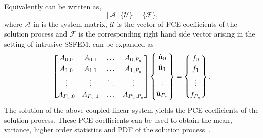 \documentclass[letter,1p,11pt,oneside,onecolumn,sort&compress]{elsarticle}
\begin{document}
Equivalently  can be written as,
\begin{equation}\label{eq:sFEM}
\mathcal{[A] \{U\} = \{F\}},
\end{equation}
where $\mathcal{A}$ in  is the system matrix,
$\mathcal{U}$ is the vector of PCE coefficients of the solution process and
$\mathcal{F}$ is the corresponding right hand side vector arising in the setting of intrusive SSFEM.  can be expanded as
\begin{align}
{\begin{bmatrix}
      A_{0,0} & A_{0,1} & \dots  &  A_{0,P_u}
\\[0.3em]
      A_{1,0} & A_{1,1} & \dots  &  A_{1,P_u}
\\[0.3em]
      \vdots  & \vdots  & \ddots &  \vdots
\\[0.3em]
     A_{P_u,0} & A_{P_u,1} & \dots  &  A_{P_u,P_u}
\end{bmatrix}}
\begin{Bmatrix}
    \mathrm{\hat{\bf{u}}}_0
\\[0.3em]
    \mathrm{\hat{\bf{u}}}_1
 \\[0.3em]
    \vdots
 \\[0.3em]
    \mathrm{\hat{\bf{u}}}_{P_u}
 \\[0.3em]
\end{Bmatrix}  =
\begin{Bmatrix}
      f_0
\\[0.3em]
      f_1
\\[0.3em]
      \vdots
 \\[0.3em]
      f_{P_u}
\end{Bmatrix}.
\label{eq:sFEM_expnd}
\end{align}
The solution of the above coupled linear system yields the PCE coefficients of the solution process. These PCE coefficients can be used to obtain the mean, variance, higher order statistics and PDF of the solution process~\cite{ghanemSFEM1991}.
\end{document}
